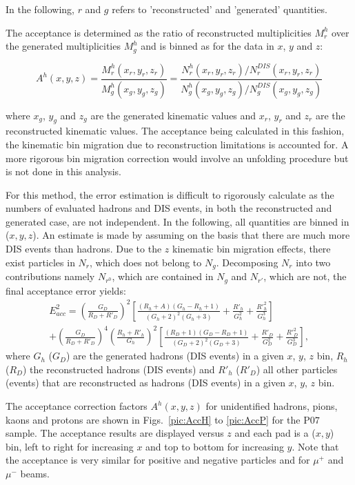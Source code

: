 In the following, $r$ and $g$ refers to 'reconstructed' and 'generated' quantities.

The acceptance is determined as the ratio of reconstructed multiplicities $M^h_r$ over the generated multiplicities $M^h_g$ and is binned as for the data in $x$, $y$ and $z$:

\begin{equation}
  A^h(x,y,z) = \frac{M^h_r(x_r,y_r,z_r)}{M^h_g(x_g,y_g,z_g)}=\frac{N^h_r(x_r,y_r,z_r)/N^{DIS}_r(x_r,y_r,z_r)}{N^h_g(x_g,y_g,z_g)/N^{DIS}_g(x_g,y_g,z_g)}
\end{equation}

where $x_g$, $y_g$ and $z_g$ are the generated kinematic values and $x_r$, $y_r$ and $z_r$ are the reconstructed kinematic values. The acceptance being calculated in this fashion, the kinematic bin migration due to reconstruction limitations is accounted for. A more rigorous bin migration correction would involve an unfolding procedure but is not done in this analysis.

For this method, the error estimation is difficult to rigorously calculate as the numbers of evaluated hadrons and DIS events, in both the reconstructed and generated case, are not independent. In the following, all quantities are binned in ($x,y,z$). An estimate is made by assuming on the basis that there are much more DIS events than hadrons. Due to the $z$ kinematic bin migration effects, there exist particles in $N_r$, which does not belong to $N_g$. Decomposing $N_r$ into two contributions namely $N_{r^0}$, which are contained in $N_g$ and $N_{r'}$, which are not, the final acceptance error yields:
%
\begin{equation}
  \begin{split}
    E^2_{acc} = \left (\frac{G_D}{R_D+R'_{D}}\right )^2\left [\frac{(R_h+A)(G_h-R_h+1)}{(G_h+2)^2(G_h+3)}+\frac{R'_{h}}{G^2_h}+\frac{R'^2_h}{G^3_h}\right ] \\
                + \left (\frac{G_D}{R_D+R'_{D}}\right )^4\left (\frac{R_h+R'_h}{G_h}\right )^2\left [\frac{(R_D+1)(G_D-R_D+1)}{(G_D+2)^2(G_D+3)}+\frac{R'_D}{G^2_D}+\frac{R'^2_D}{G^3_D}\right ],
  \end{split}
\end{equation}
%
where $G_h$ ($G_D$) are the generated hadrons (DIS events) in a given $x$, $y$, $z$ bin, $R_h$ ($R_D$) the reconstructed hadrons (DIS events) and $R'_h$ ($R'_D$) all other particles (events) that are reconstructed as hadrons (DIS events) in a given $x$, $y$, $z$ bin.

The acceptance correction factors $A^h(x,y,z)$ for unidentified hadrons, pions, kaons and protons are shown in Figs.~\ref{pic:AccH} to \ref{pic:AccP} for the P$07$ sample. The acceptance results are displayed versus $z$ and each pad is a ($x,y$) bin, left to right for increasing $x$ and top to bottom for increasing $y$. Note that the acceptance is very similar for positive and negative particles and for $\mu^+$ and $\mu^-$ beams.

